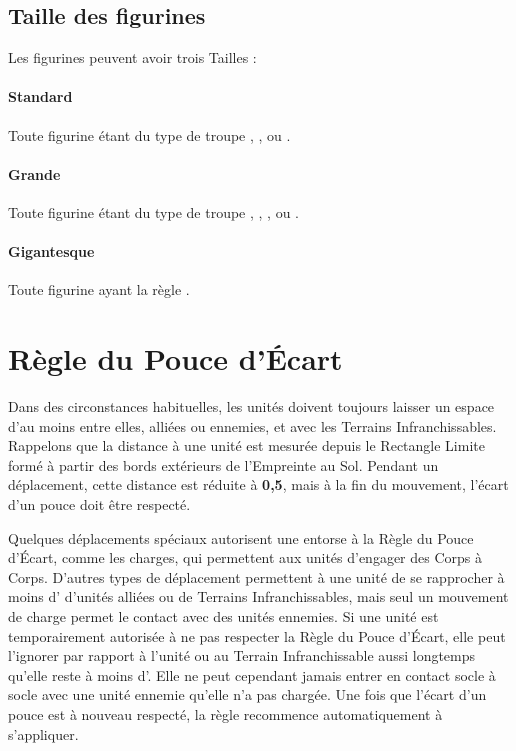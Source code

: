 \subsection{Taille des figurines}
\label{modelheight}

Les figurines peuvent avoir trois Tailles :

\paragraph{Standard}

Toute figurine étant du type de troupe \infantry{}, \warbeast{}, \swarm{} ou \warmachine{}.

\paragraph{Grande}

Toute figurine étant du type de troupe \cavalry{}, \monstrousinfantry{}, \monstrouscavalry{}, \monstrousbeast{} ou \chariot{}.

\paragraph{Gigantesque}

Toute figurine ayant la règle \toweringpresence{}.

\section{Règle du Pouce d'Écart}
\label{unit_spacing}

Dans des circonstances habituelles, les unités doivent toujours laisser un espace d'au moins  entre elles, alliées ou ennemies, et avec les Terrains Infranchissables. Rappelons que la distance à une unité est mesurée depuis le Rectangle Limite formé à partir des bords extérieurs de l'Empreinte au Sol. Pendant un déplacement, cette distance est réduite à \textbf{0,5}\distance{}, mais à la fin du mouvement, l'écart d'un pouce doit être respecté.

Quelques déplacements spéciaux autorisent une entorse à la Règle du Pouce d'Écart, comme les charges, qui permettent aux unités d'engager des Corps à Corps. D'autres types de déplacement permettent à une unité de se rapprocher à moins d' d'unités alliées ou de Terrains Infranchissables, mais seul un mouvement de charge permet le contact avec des unités ennemies. Si une unité est temporairement autorisée à ne pas respecter la Règle du Pouce d'Écart, elle peut l'ignorer par rapport à l'unité ou au Terrain Infranchissable aussi longtemps qu'elle reste à moins d'. Elle ne peut cependant jamais entrer en contact socle à socle avec une unité ennemie qu'elle n'a pas chargée. Une fois que l'écart d'un pouce est à nouveau respecté, la règle recommence automatiquement à s'appliquer.

